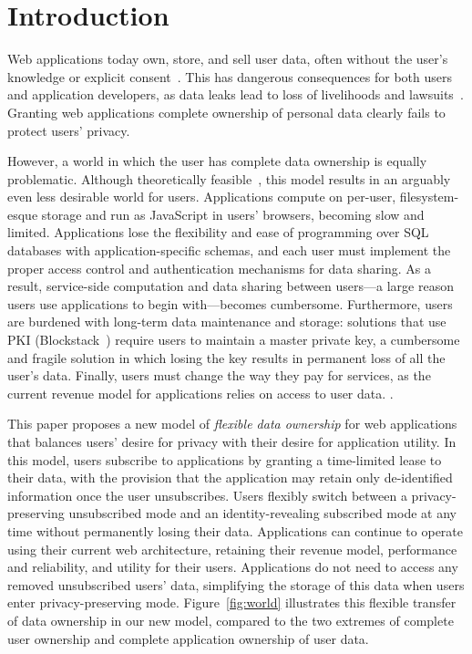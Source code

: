 \section{Introduction}

Web applications today own, store, and sell user data, often without the user's knowledge or
explicit consent~\cite{nytimes:fb, npr:data}. This has dangerous consequences for both users and
application developers, as data leaks lead to loss of livelihoods and lawsuits~\cite{breach:twitter,
breach:fb, breach:marriott, breach:quora}. Granting web applications complete ownership
of personal data clearly fails to protect users' privacy. 

However, a world in which the user has complete data ownership is equally problematic. Although
theoretically feasible~\cite{amber, w5, blockstack, bstore}, this model results in an arguably even
less desirable world for users. 
%
Applications compute on per-user, filesystem-esque storage and run as JavaScript in users' browsers,
becoming slow and limited. Applications lose the flexibility and ease of programming over SQL
databases with application-specific schemas, and each user must implement the proper access control
and authentication mechanisms for data sharing.  As a result, service-side computation and data
sharing between users---a large reason users use applications to begin with---becomes cumbersome.
Furthermore, users are burdened with long-term data maintenance and storage: solutions that use PKI
(\eg Blockstack~\cite{blockstack}) require users to maintain a master private key, a cumbersome and
fragile solution in which losing the key results in permanent loss of all the user's data.
%
Finally, users must change the way they pay for services, as the current revenue model for
applications relies on access to user data. 
.

This paper proposes a new model of \emph{flexible data ownership} for web applications that balances
users' desire for privacy with their desire for application utility. In this model, users subscribe
to applications by granting a time-limited lease to their data, with the provision that the
application may retain only de-identified information once the user unsubscribes. Users flexibly
switch between a privacy-preserving unsubscribed mode and an identity-revealing subscribed mode at
any time without permanently losing their data. Applications can continue to operate using their
current web architecture, retaining their revenue model, performance and reliability, and utility
for their users. Applications do not need to access any removed unsubscribed users' data,
simplifying the storage of this data when users enter privacy-preserving mode.
Figure~\ref{fig:world} illustrates this flexible transfer of data ownership in our new model,
compared to the two extremes of complete user ownership and complete application ownership of user
data.

